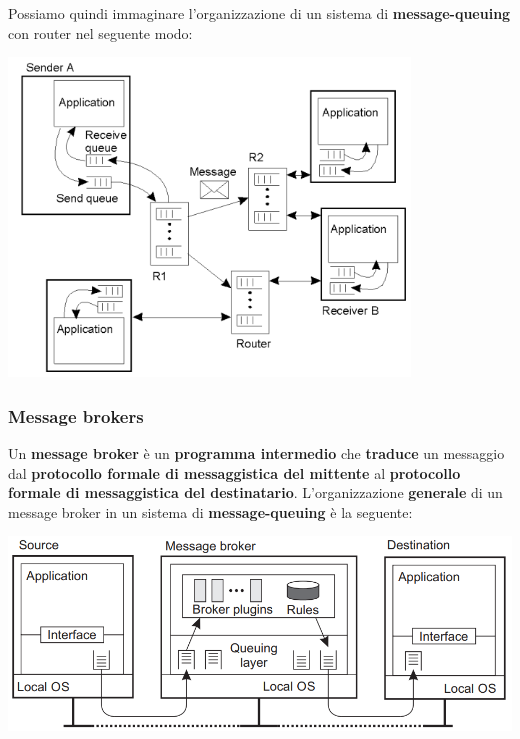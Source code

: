 \documentclass[12pt]{article}
\begin{document}
Possiamo quindi immaginare l'organizzazione di un sistema di \textbf{message-queuing} con router nel seguente modo:
\begin{center}
    \includegraphics[width = 0.80\textwidth]{Images/140.PNG}
\end{center}
\subsubsection{Message brokers}
Un \textbf{message broker} è un \textbf{programma intermedio} che \textbf{traduce} un messaggio dal \textbf{protocollo formale di messaggistica del mittente} al \textbf{protocollo formale di messaggistica del destinatario}. L'organizzazione \textbf{generale} di un message broker in un sistema di \textbf{message-queuing} è la seguente:
\begin{center}
    \includegraphics[width = 1\textwidth]{Images/141.PNG}
\end{center}
\end{document}
